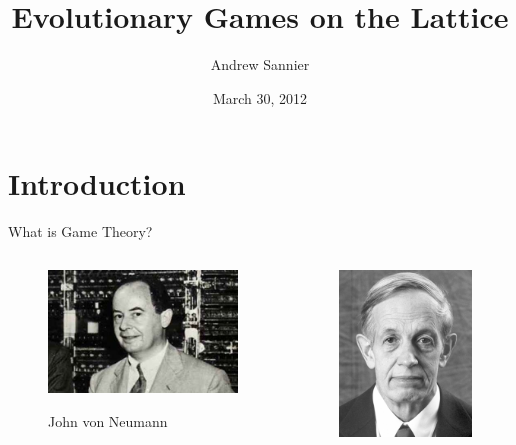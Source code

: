 \documentclass{beamer}
\title{Evolutionary Games on the Lattice}
\author{Andrew Sannier}
\date{March 30, 2012}
\begin{document}
\begin{frame}
\titlepage
\end{frame}

\section{Introduction}
\begin{frame}[c]{What is Game Theory?}
\begin{columns}[c]
  \begin{column}{.5\textwidth}
    \begin{figure}  
      \includegraphics[width=\textwidth]{./images/vonNeumann.jpg}

      \small{John von Neumann}
    \end{figure}
  \end{column}
  \begin{column}{.5\textwidth}
    \begin{figure}
      \includegraphics[width=.7\textwidth]{./images/nash.jpg}


\end{figure}
\end{column}
\end{columns}
\end{frame}
\end{document}
